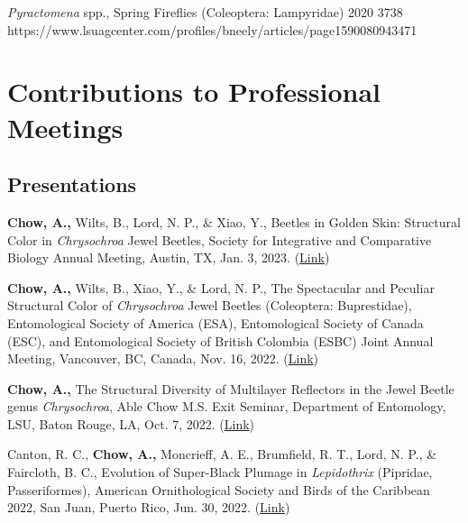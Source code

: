 \documentclass{article}
\newcommand{\hindent}{\hangindent=10pt}
\begin{document}
{\textit{Pyractomena} spp., Spring Fireflies (Coleoptera: Lampyridae)}
{2020}
{3738}
{https://www.lsuagcenter.com/profiles/bneely/articles/page1590080943471}

\section{Contributions to Professional Meetings}
\newcommand{\presentation}[6]{
    \noindent
    \hindent
    \small
    {#1} %
    {#2}, %
    {#3}, %
    {#5}, %
    {#4}. %
    (\href{#6}{Link}) %
    \normalsize \par
}

\subsection{Presentations}
\presentation{\textbf{Chow, A.,} Wilts, B., Lord, N. P., \& Xiao, Y.,}
{Beetles in Golden Skin: Structural Color in \textit{Chrysochroa} Jewel Beetles}
{Society for Integrative and Comparative Biology Annual Meeting}
{Jan. 3, 2023}
{Austin, TX}
{https://sicb.org/wp-content/uploads/2023/04/2023-SICB-Program-R5.pdf}

\presentation{\textbf{Chow, A.,} Wilts, B., Xiao, Y., \& Lord, N. P.,}
{The Spectacular and Peculiar Structural Color of \textit{Chrysochroa} Jewel Beetles (Coleoptera: Buprestidae)} 
{Entomological Society of America (ESA), Entomological Society of Canada (ESC), and Entomological Society of British Colombia (ESBC) Joint Annual Meeting}
{Nov. 16, 2022}
{Vancouver, BC, Canada}
{https://cdmcd.co/B7pd5w}

\presentation{\textbf{Chow, A.,}}
{The Structural Diversity of Multilayer Reflectors in the Jewel Beetle genus \textit{Chrysochroa}}
{Able Chow M.S. Exit Seminar, Department of Entomology, LSU}
{Oct. 7, 2022}
{Baton Rouge, LA}
{https://youtu.be/nBmbMNkQpHo}

\presentation{Canton, R. C., \textbf{Chow, A.,} Moncrieff, A. E., Brumfield, R. T., Lord, N. P., \& Faircloth, B. C.,}
{Evolution of Super-Black Plumage in \textit{Lepidothrix} (Pipridae, Passeriformes)}
{American Ornithological Society and Birds of the Caribbean 2022}
{Jun. 30, 2022}
{San Juan, Puerto Rico}
{https://drive.google.com/file/d/1Jgpf3TN-OHAr3bEgD9NFvzokJmAGDYTp/view?usp=sharing}
\end{document}
